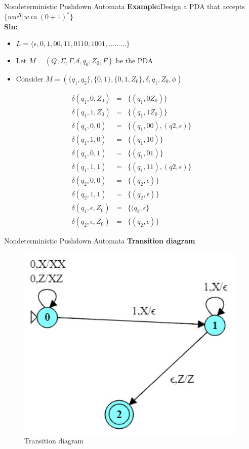 \documentclass{beamer}
\begin{document}
\begin{frame}{Nondeterministic Pushdown Automata}
\textbf{Example:}Design a PDA that accepts $\{ww^R | w\  in\  (0+1)^*\}$\\
\textbf{Sln:}
\begin{itemize}
	\item $L = \{ \epsilon, 0, 1, 00, 11, 0110, 1001, .........\}$
	\item Let $M= (Q, \Sigma, \Gamma, \delta, q_0, Z_0, F)$ be the PDA
	\item Consider $M = (\{q_1, q_2\}, \{0, 1\}, \{0, 1, Z_0\}, \delta, q_1, Z_0, \phi)$
\end{itemize}
\small
\begin{eqnarray*}
	\delta(q_1,0,Z_0)&=&\{(q_1,0Z_0)\}  \\
		\delta(q_1,1,Z_0)&=&\{(q_1,1Z_0)\} \\
	\delta(q_1,0,0)&=&\{(q_1,00),(q2, \epsilon)\} \\
	\delta(q_1,1,0)&=&\{(q_1,10)\} \\
	\delta(q_1,0,1)&=&\{(q_1,01)\} \\
	\delta(q_1,1,1)&=&\{(q_1,11),(q2, \epsilon)\} \\
	\delta(q_2,0,0)&=&\{(q_2, \epsilon)\} \\
	\delta(q_2,1,1)&=&\{(q_2, \epsilon)\} \\
	\delta(q_1,\epsilon,Z_0)&=&\{(q_2, \epsilon \} \\
	\delta(q_2,\epsilon,Z_0)&=&\{(q_2, \epsilon)\} 
\end{eqnarray*}
\end{frame}	
\begin{frame}{Nondeterministic Pushdown Automata}
	\textbf{Transition diagram}
	\begin{figure}
	\includegraphics[scale=.7]{img4/m2}
	\caption{Transition diagram}
\end{figure}
\end{frame}	
\end{document}
